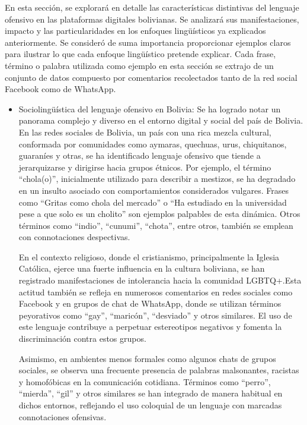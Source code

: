 En esta sección, se explorará en detalle las características distintivas del lenguaje ofensivo en las plataformas digitales bolivianas. Se analizará sus manifestaciones, impacto y las particularidades  en los enfoques lingüísticos ya explicados anteriormente. Se consideró de suma importancia proporcionar ejemplos claros para ilustrar lo que cada enfoque lingüístico pretende explicar. Cada frase, término o palabra utilizada como ejemplo en esta sección se extrajo de un conjunto de datos compuesto por comentarios recolectados tanto de la red social Facebook como de WhatsApp.

\begin{itemize}

	\item Sociolingüística del lenguaje ofensivo en Bolivia:  Se ha logrado notar un panorama complejo y diverso en el entorno digital y social del país de Bolivia. En las redes sociales de Bolivia, un país con una rica mezcla cultural, conformada por comunidades como aymaras, quechuas, urus, chiquitanos, guaraníes y otras, se ha identificado lenguaje ofensivo que tiende a jerarquizarse y dirigirse hacia grupos étnicos. Por ejemplo, el término ``chola(o)'', inicialmente utilizado para describir a mestizos, se ha degradado en un insulto asociado con comportamientos considerados vulgares. Frases como ``Gritas como chola del mercado'' o ``Ha estudiado en la universidad pese a que solo es un cholito'' son ejemplos palpables de esta dinámica. Otros términos como ``indio'', ``cunumi'', ``chota'', entre otros, también se emplean con connotaciones despectivas.
	
En el contexto religioso, donde el cristianismo, principalmente la Iglesia Católica, ejerce una fuerte influencia en la cultura boliviana, se han registrado manifestaciones de intolerancia hacia la comunidad LGBTQ+.Esta actitud también se refleja en numerosos comentarios en redes sociales como Facebook y en grupos de chat de WhatsApp, donde se utilizan términos peyorativos como ``gay'', ``maricón'', ``desviado'' y otros similares. El uso de este lenguaje contribuye a perpetuar estereotipos negativos y fomenta la discriminación contra estos grupos.

Asimismo, en ambientes menos formales como algunos chats de grupos sociales, se observa una frecuente presencia de palabras malsonantes, racistas y homofóbicas en la comunicación cotidiana. Términos como ``perro'', ``mierda'', ``gil'' y otros similares se han integrado de manera habitual en dichos entornos, reflejando el uso coloquial de un lenguaje con marcadas connotaciones ofensivas.


\end{itemize}
